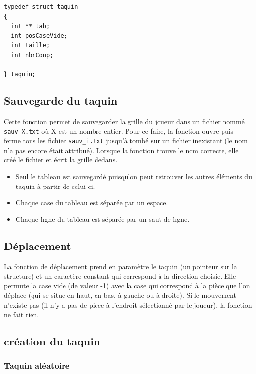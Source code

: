 \documentclass[a4paper]{article}
\begin{document}
\begin{lstlisting}
typedef struct taquin
{
  int ** tab;
  int posCaseVide;
  int taille;
  int nbrCoup;
  
} taquin;
\end{lstlisting}


\subsection{Sauvegarde du taquin}
\label{subsec:sauv}

Cette fonction permet de sauvegarder la grille du joueur dans un fichier nommé
\texttt{sauv\_X.txt} où X est un nombre entier. Pour ce faire, la fonction ouvre
puis ferme tous les fichier \texttt{sauv\_i.txt} jusqu'à tombé sur un fichier
inexistant (le nom n'a pas encore était attribué). Lorsque la fonction trouve le
nom correcte, elle créé le fichier et écrit la grille dedans.

\begin{itemize}
\item Seul le tableau est sauvegardé puisqu'on peut retrouver les autres éléments du taquin à partir de celui-ci.
\item Chaque case du tableau est séparée par un espace.
\item Chaque ligne du tableau est séparée par un saut de ligne.
\end{itemize}

\subsection{Déplacement}
\label{subsec:label}

La fonction de déplacement prend en paramètre le taquin (un pointeur sur la
structure) et un caractère constant qui correspond à la direction choisie. Elle
permute la case vide (de valeur -1) avec la case qui correspond à la pièce que
l'on déplace (qui se situe en haut, en bas, à gauche ou à droite). Si le
mouvement n'existe pas (il n'y a pas de pièce à l'endroit sélectionné par le
joueur), la fonction ne fait rien.

\subsection{création du taquin}
\label{subsec:creaTaquin}

\subsubsection{Taquin aléatoire}
\label{subsubsec:creaAlea}
\end{document}
